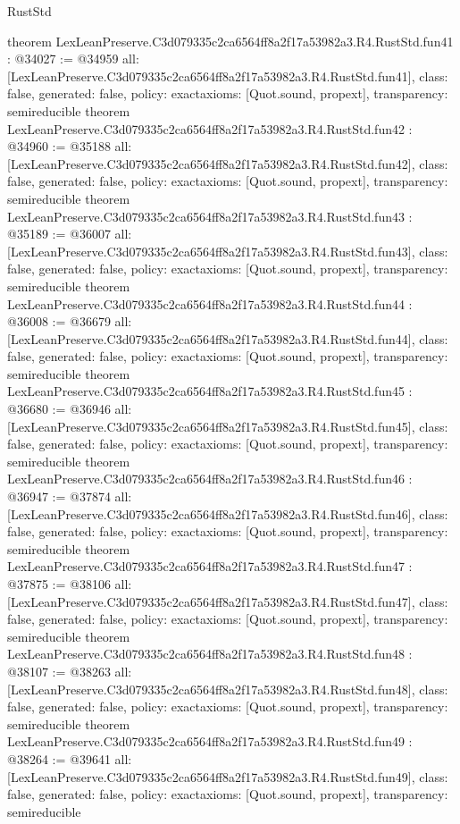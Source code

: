 \begin{lexlean}{RustStd}
\begin{coremodule}
{}
theorem LexLeanPreserve.C3d079335c2ca6564ff8a2f17a53982a3.R4.RustStd.fun41 : @34027 := @34959 {
  all: [LexLeanPreserve.C3d079335c2ca6564ff8a2f17a53982a3.R4.RustStd.fun41],
  class: false,
  generated: false,
  policy: exact{axioms: [Quot.sound, propext]},
  transparency: semireducible
}
theorem LexLeanPreserve.C3d079335c2ca6564ff8a2f17a53982a3.R4.RustStd.fun42 : @34960 := @35188 {
  all: [LexLeanPreserve.C3d079335c2ca6564ff8a2f17a53982a3.R4.RustStd.fun42],
  class: false,
  generated: false,
  policy: exact{axioms: [Quot.sound, propext]},
  transparency: semireducible
}
theorem LexLeanPreserve.C3d079335c2ca6564ff8a2f17a53982a3.R4.RustStd.fun43 : @35189 := @36007 {
  all: [LexLeanPreserve.C3d079335c2ca6564ff8a2f17a53982a3.R4.RustStd.fun43],
  class: false,
  generated: false,
  policy: exact{axioms: [Quot.sound, propext]},
  transparency: semireducible
}
theorem LexLeanPreserve.C3d079335c2ca6564ff8a2f17a53982a3.R4.RustStd.fun44 : @36008 := @36679 {
  all: [LexLeanPreserve.C3d079335c2ca6564ff8a2f17a53982a3.R4.RustStd.fun44],
  class: false,
  generated: false,
  policy: exact{axioms: [Quot.sound, propext]},
  transparency: semireducible
}
theorem LexLeanPreserve.C3d079335c2ca6564ff8a2f17a53982a3.R4.RustStd.fun45 : @36680 := @36946 {
  all: [LexLeanPreserve.C3d079335c2ca6564ff8a2f17a53982a3.R4.RustStd.fun45],
  class: false,
  generated: false,
  policy: exact{axioms: [Quot.sound, propext]},
  transparency: semireducible
}
theorem LexLeanPreserve.C3d079335c2ca6564ff8a2f17a53982a3.R4.RustStd.fun46 : @36947 := @37874 {
  all: [LexLeanPreserve.C3d079335c2ca6564ff8a2f17a53982a3.R4.RustStd.fun46],
  class: false,
  generated: false,
  policy: exact{axioms: [Quot.sound, propext]},
  transparency: semireducible
}
theorem LexLeanPreserve.C3d079335c2ca6564ff8a2f17a53982a3.R4.RustStd.fun47 : @37875 := @38106 {
  all: [LexLeanPreserve.C3d079335c2ca6564ff8a2f17a53982a3.R4.RustStd.fun47],
  class: false,
  generated: false,
  policy: exact{axioms: [Quot.sound, propext]},
  transparency: semireducible
}
theorem LexLeanPreserve.C3d079335c2ca6564ff8a2f17a53982a3.R4.RustStd.fun48 : @38107 := @38263 {
  all: [LexLeanPreserve.C3d079335c2ca6564ff8a2f17a53982a3.R4.RustStd.fun48],
  class: false,
  generated: false,
  policy: exact{axioms: [Quot.sound, propext]},
  transparency: semireducible
}
theorem LexLeanPreserve.C3d079335c2ca6564ff8a2f17a53982a3.R4.RustStd.fun49 : @38264 := @39641 {
  all: [LexLeanPreserve.C3d079335c2ca6564ff8a2f17a53982a3.R4.RustStd.fun49],
  class: false,
  generated: false,
  policy: exact{axioms: [Quot.sound, propext]},
  transparency: semireducible
}
\end{coremodule}
\end{lexlean}
